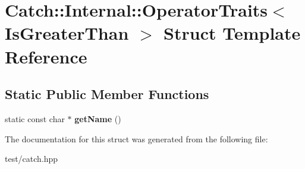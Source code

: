 \hypertarget{structCatch_1_1Internal_1_1OperatorTraits_3_01IsGreaterThan_01_4}{}\section{Catch\+:\+:Internal\+:\+:Operator\+Traits$<$ Is\+Greater\+Than $>$ Struct Template Reference}
\label{structCatch_1_1Internal_1_1OperatorTraits_3_01IsGreaterThan_01_4}
\subsection*{Static Public Member Functions}
\begin{DoxyCompactItemize}
\item 
static const char $\ast$ {\bfseries get\+Name} ()\hypertarget{structCatch_1_1Internal_1_1OperatorTraits_3_01IsGreaterThan_01_4_ab917bfb9ccbe461dc684ee5a34d67d27}{}\label{structCatch_1_1Internal_1_1OperatorTraits_3_01IsGreaterThan_01_4_ab917bfb9ccbe461dc684ee5a34d67d27}

\end{DoxyCompactItemize}


The documentation for this struct was generated from the following file\+:\begin{DoxyCompactItemize}
\item 
test/catch.\+hpp\end{DoxyCompactItemize}
